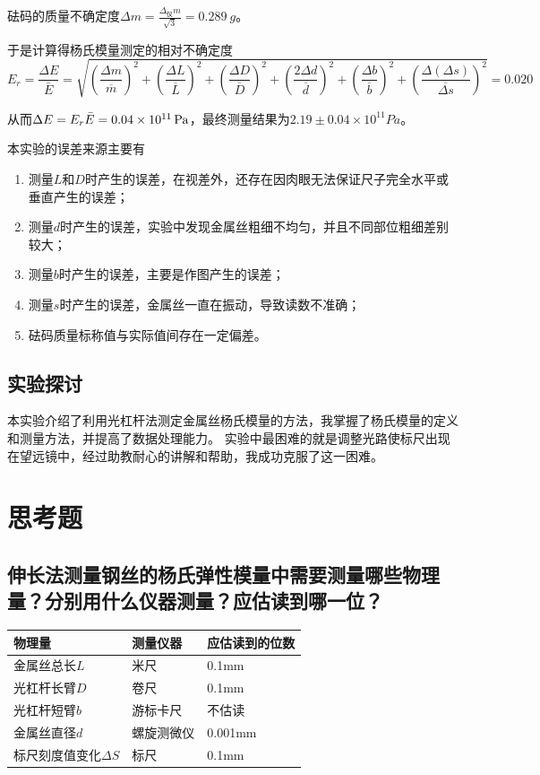 \documentclass[]{../../templates/Report}%
\begin{document}
\begin{fullreportonly}
砝码的质量不确定度$\Delta m = \frac{\Delta_\text{仪} m}{\sqrt{3}} = \SI{0.289}{g}$。

于是计算得杨氏模量测定的相对不确定度
\[E_r = \frac{\Delta E}{\bar{E}} = \sqrt{\left(\frac{\Delta m}{\overline{m}}\right)^2 +\left(\frac{\Delta L}{\overline{L}}\right)^2 + \left(\frac{\Delta D}{\overline{D}}\right)^2 + \left(\frac{2\Delta d}{\overline{d}}\right)^2 + \left(\frac{\Delta b}{\overline{b}}\right)^2 + \left(\frac{\Delta \left(\Delta s\right)}{\overline{\Delta s}}\right)^2}
=0.020\]

从而$\Delta E = E_r \bar{E} = \SI{0.04E11}{Pa}$，最终测量结果为$2.19 \pm 0.04 \times 10^{11} \si{Pa}$。

本实验的误差来源主要有
\begin{enumerate}
    \item 测量$L$和$D$时产生的误差，在视差外，还存在因肉眼无法保证尺子完全水平或垂直产生的误差；
    \item 测量$d$时产生的误差，实验中发现金属丝粗细不均匀，并且不同部位粗细差别较大；
    \item 测量$b$时产生的误差，主要是作图产生的误差；
    \item 测量$s$时产生的误差，金属丝一直在振动，导致读数不准确；
    \item 砝码质量标称值与实际值间存在一定偏差。
\end{enumerate}

\subsection{实验探讨}
本实验介绍了利用光杠杆法测定金属丝杨氏模量的方法，我掌握了杨氏模量的定义和测量方法，并提高了数据处理能力。
实验中最困难的就是调整光路使标尺出现在望远镜中，经过助教耐心的讲解和帮助，我成功克服了这一困难。

\section{思考题}

\subsection{伸长法测量钢丝的杨氏弹性模量中需要测量哪些物理量？分别用什么仪器测量？应估读到哪一位？}
\begin{table}[H]
	\centering
	\begin{tabular}{C{.2\textwidth}C{.2\textwidth}C{.2\textwidth}}
		\toprule
		物理量 & 测量仪器 & 应估读到的位数 \\
		\midrule
		金属丝总长$L$ & 米尺 & 0.1mm \\
		光杠杆长臂$D$ & 卷尺 & 0.1mm \\
		光杠杆短臂$b$ & 游标卡尺 & 不估读 \\
		金属丝直径$d$ & 螺旋测微仪 & 0.001mm \\
		标尺刻度值变化$\Delta S$ & 标尺 & 0.1mm \\
		\bottomrule
	\end{tabular}
\end{table}



\end{fullreportonly}
\end{document}
